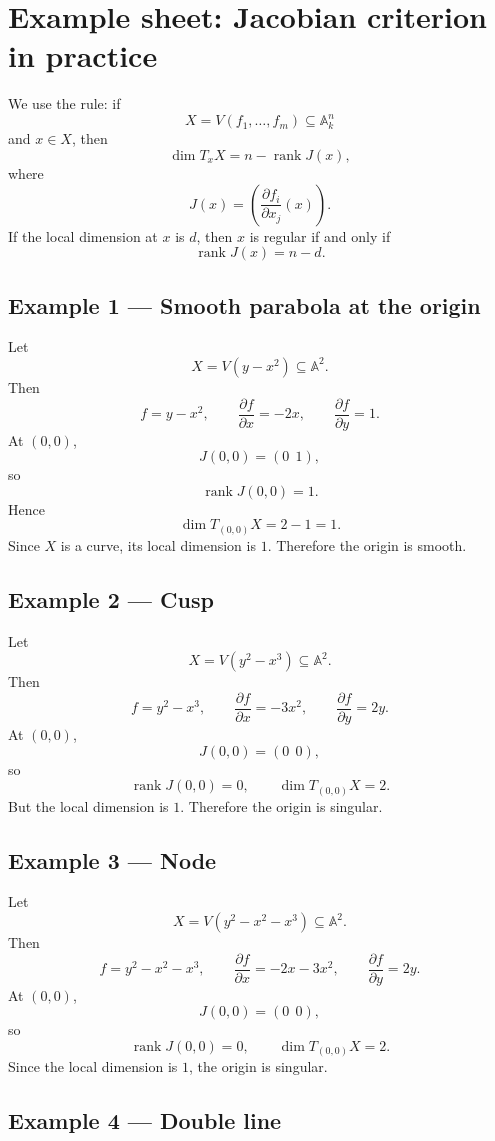 \documentclass[12pt,a4paper]{article}
\theoremstyle{plain}
\theoremstyle{definition}      %
\begin{document}
	\section*{Example sheet: Jacobian criterion in practice}
	
	We use the rule: if
	\[
	X=V(f_1,\dots,f_m)\subseteq \mathbb A^n_k
	\]
	and \(x\in X\), then
	\[
	\dim T_xX = n-\operatorname{rank} J(x),
	\]
	where
	\[
	J(x)=\left(\frac{\partial f_i}{\partial x_j}(x)\right).
	\]
	If the local dimension at \(x\) is \(d\), then \(x\) is regular if and only if
	\[
	\operatorname{rank}J(x)=n-d.
	\]
	
	\subsection*{Example 1 --- Smooth parabola at the origin}
	
	Let
	\[
	X=V(y-x^2)\subseteq \mathbb A^2.
	\]
	Then
	\[
	f=y-x^2,
	\qquad
	\frac{\partial f}{\partial x}=-2x,
	\qquad
	\frac{\partial f}{\partial y}=1.
	\]
	At \((0,0)\),
	\[
	J(0,0)=(0\ \ 1),
	\]
	so
	\[
	\operatorname{rank}J(0,0)=1.
	\]
	Hence
	\[
	\dim T_{(0,0)}X=2-1=1.
	\]
	Since \(X\) is a curve, its local dimension is \(1\). Therefore the origin is smooth.
	
	\subsection*{Example 2 --- Cusp}
	
	Let
	\[
	X=V(y^2-x^3)\subseteq \mathbb A^2.
	\]
	Then
	\[
	f=y^2-x^3,
	\qquad
	\frac{\partial f}{\partial x}=-3x^2,
	\qquad
	\frac{\partial f}{\partial y}=2y.
	\]
	At \((0,0)\),
	\[
	J(0,0)=(0\ \ 0),
	\]
	so
	\[
	\operatorname{rank}J(0,0)=0,
	\qquad
	\dim T_{(0,0)}X=2.
	\]
	But the local dimension is \(1\). Therefore the origin is singular.
	
	\subsection*{Example 3 --- Node}
	
	Let
	\[
	X=V(y^2-x^2-x^3)\subseteq \mathbb A^2.
	\]
	Then
	\[
	f=y^2-x^2-x^3,
	\qquad
	\frac{\partial f}{\partial x}=-2x-3x^2,
	\qquad
	\frac{\partial f}{\partial y}=2y.
	\]
	At \((0,0)\),
	\[
	J(0,0)=(0\ \ 0),
	\]
	so
	\[
	\operatorname{rank}J(0,0)=0,
	\qquad
	\dim T_{(0,0)}X=2.
	\]
	Since the local dimension is \(1\), the origin is singular.
	
	\subsection*{Example 4 --- Double line}
	
\end{document}

